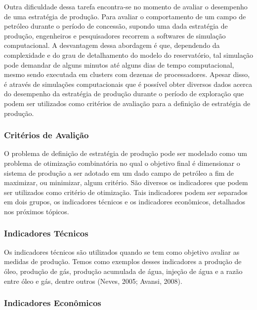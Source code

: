 Outra dificuldade dessa tarefa encontra-se no momento de avaliar o desempenho de uma estratégia de produção. Para avaliar o comportamento de um campo de petróleo durante o período de concessão, supondo uma dada estratégia de produção, engenheiros e pesquisadores recorrem a softwares de simulação computacional. A desvantagem dessa abordagem é que, dependendo da complexidade e do grau de detalhamento do modelo do reservatório, tal simulação pode demandar de alguns minutos até alguns dias de tempo computacional, mesmo sendo executada em clusters com dezenas de processadores. Apesar disso, é através de simulações computacionais que é possível obter diversos dados acerca do desempenho da estratégia de produção durante o período de exploração que podem ser utilizados como critérios de avaliação para a definição de estratégia de produção. 

\subsubsection{Critérios de Avalição}

O problema de definição de estratégia de produção pode ser modelado como um problema de otimização combinatória no qual o objetivo final é dimensionar o sistema de produção a ser adotado em um dado campo de petróleo a fim de maximizar, ou minimizar, algum critério. São diversos os indicadores que podem ser utilizados como critério de otimização. Tais indicadores podem ser separados em dois grupos, os indicadores técnicos e os indicadores econômicos, detalhados nos próximos tópicos. 

\subsubsection{Indicadores Técnicos}

Os indicadores técnicos são utilizados quando se tem como objetivo avaliar as medidas de produção. Temos como exemplos desses indicadores a produção de óleo, produção de gás, produção acumulada de água, injeção de água e a razão entre óleo e gás, dentre outros (Neves, 2005; Avansi, 2008).

\subsubsection{Indicadores Econômicos}


